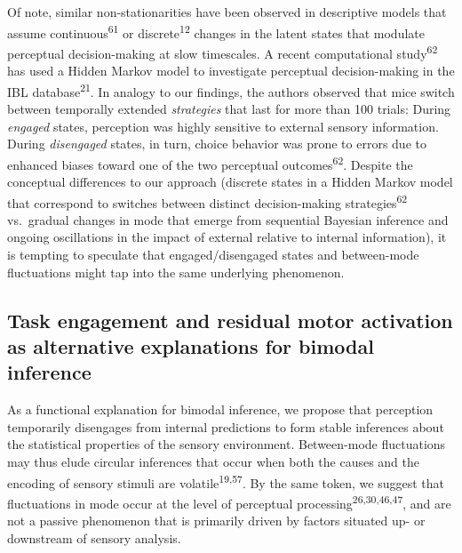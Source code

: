 \documentclass[
]{article}
\begin{document}
Of note, similar non-stationarities have been observed in descriptive
models that assume continuous\textsuperscript{61} or
discrete\textsuperscript{12} changes in the latent states that modulate
perceptual decision-making at slow timescales. A recent computational
study\textsuperscript{62} has used a Hidden Markov model to investigate
perceptual decision-making in the IBL database\textsuperscript{21}. In
analogy to our findings, the authors observed that mice switch between
temporally extended \emph{strategies} that last for more than 100
trials: During \emph{engaged} states, perception was highly sensitive to
external sensory information. During \emph{disengaged} states, in turn,
choice behavior was prone to errors due to enhanced biases toward one of
the two perceptual outcomes\textsuperscript{62}. Despite the conceptual
differences to our approach (discrete states in a Hidden Markov model
that correspond to switches between distinct decision-making
strategies\textsuperscript{62} vs.~gradual changes in mode that emerge
from sequential Bayesian inference and ongoing oscillations in the
impact of external relative to internal information), it is tempting to
speculate that engaged/disengaged states and between-mode fluctuations
might tap into the same underlying phenomenon.

\hypertarget{task-engagement-and-residual-motor-activation-as-alternative-explanations-for-bimodal-inference}{%
\subsection{Task engagement and residual motor activation as alternative
explanations for bimodal
inference}\label{task-engagement-and-residual-motor-activation-as-alternative-explanations-for-bimodal-inference}}

As a functional explanation for bimodal inference, we propose that
perception temporarily disengages from internal predictions to form
stable inferences about the statistical properties of the sensory
environment. Between-mode fluctuations may thus elude circular
inferences that occur when both the causes and the encoding of sensory
stimuli are volatile\textsuperscript{19,57}. By the same token, we
suggest that fluctuations in mode occur at the level of perceptual
processing\textsuperscript{26,30,46,47}, and are not a passive
phenomenon that is primarily driven by factors situated up- or
downstream of sensory analysis.
\end{document}
